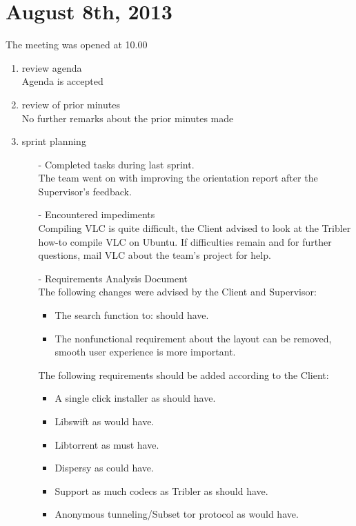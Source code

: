 \section{August 8th, 2013}
The meeting was opened at 10.00

\begin{enumerate}
\item review agenda	\\
Agenda is accepted

\item review of prior minutes\\
No further remarks about the prior minutes made

\item sprint planning

\begin{enumerate}
\item[-] Completed tasks during last sprint.\\
The team went on with improving the orientation report after the Supervisor's feedback.

\item[-] Encountered impediments\\
Compiling VLC is quite difficult, the Client advised to look at the Tribler how-to compile VLC on Ubuntu. If difficulties remain and for further questions, mail VLC about the team's project for help.\\

\item[-] Requirements Analysis Document\\
The following changes were advised by the Client and Supervisor:

\begin{itemize}
	\item The search function to: should have.\\
	\item The nonfunctional requirement about the layout can be removed, smooth user experience is more important.\\
\end{itemize}

The following requirements should be added according to the Client:

\begin{itemize}
	\item A single click installer as should have.\\
	\item Libswift as would have.\\
	\item Libtorrent as must have.\\
	\item Dispersy as could have.\\
	\item Support as much codecs as Tribler as should have.\\
	\item Anonymous tunneling/Subset tor protocol as would have.\\
\end{itemize}


\end{enumerate}
\end{enumerate}
